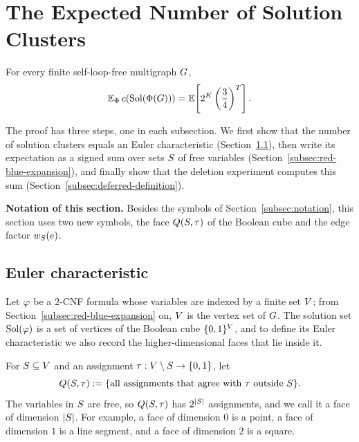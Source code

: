 \section{The Expected Number of Solution Clusters}
\label{sec:solution-components}
\label{sec:direct-identity}

\begin{mainidentityrestatement}
For every finite self-loop-free multigraph \(G\),
\[
  \E_{\Phi}\,\solcomp{\rform{\Gin}}
  =
  \Ex{2^{\Kdef}\left(\frac34\right)^{\Tdef}} .
\]
\end{mainidentityrestatement}

The proof has three steps, one in each subsection. We first show that the
number of solution clusters equals an Euler characteristic
(Section~\ref{subsec:euler-characteristic}), then write its expectation as a
signed sum over sets \(S\) of free variables
(Section~\ref{subsec:red-blue-expansion}), and finally show that the deletion
experiment computes this sum (Section~\ref{subsec:deferred-definition}).

\medskip
\noindent\textbf{Notation of this section.} Besides the symbols of
Section~\ref{subsec:notation}, this section uses two new symbols, the face
\(Q(S,\tau)\) of the Boolean cube and the edge factor
\(w_{S}(e)\).

\subsection{Euler characteristic}\label{subsec:euler-characteristic}

Let \(\varphi\) be a 2-CNF formula whose variables are indexed by a finite set
\(V\); from Section~\ref{subsec:red-blue-expansion} on, \(V\) is the
vertex set of \(G\). The solution set \(\operatorname{Sol}(\varphi)\) is a set of vertices of
the Boolean cube \(\{0,1\}^{V}\), and to define its Euler characteristic we
also record the higher-dimensional faces that lie inside it.

For \(S\subseteq V\) and an assignment
\(\tau:V\setminus S\to\{0,1\}\), let
\[
  Q(S,\tau)
  :=
  \{\text{all assignments that agree with \(\tau\) outside \(S\)}\}.
\]
The variables in \(S\) are free, so \(Q(S,\tau)\) has
\(2^{|S|}\) assignments, and we call it a face of dimension
\(|S|\). For example, a face of dimension \(0\) is a point, a face of
dimension \(1\) is a line segment, and a face of dimension \(2\) is a square.

